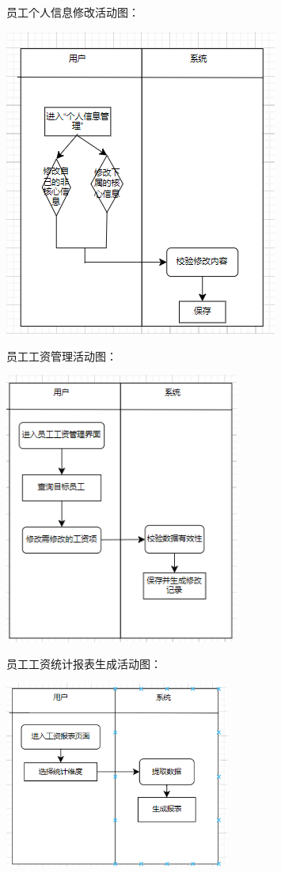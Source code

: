 \documentclass[]{article}
\begin{document}
员工个人信息修改活动图：

\includegraphics[width=3.53194in,height=3.98264in]{media/media/image10.png}

员工工资管理活动图：

\includegraphics[width=3.02917in,height=3.51458in]{media/media/image11.png}

员工工资统计报表生成活动图：

\includegraphics[width=2.90764in,height=2.41597in]{media/media/image12.png}
\end{document}
